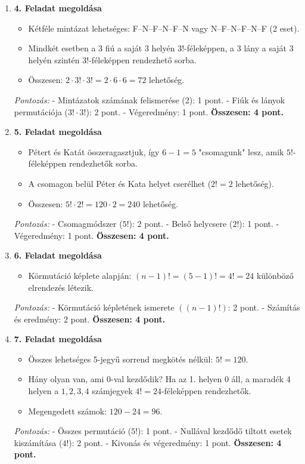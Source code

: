 \documentclass[12pt,a4paper]{article}
\begin{document}
\begin{enumerate}
    \item \textbf{4. Feladat megoldása}
    \begin{itemize}
        \item Kétféle mintázat lehetséges: F--N--F--N--F--N vagy N--F--N--F--N--F (2 eset).
        \item Mindkét esetben a 3 fiú a saját 3 helyén $3!$-féleképpen, a 3 lány a saját 3 helyén szintén $3!$-féleképpen rendezhető sorba.
        \item Összesen: $2 \cdot 3! \cdot 3! = 2 \cdot 6 \cdot 6 = 72$ lehetőség.
    \end{itemize}
    \emph{Pontozás:}
    - Mintázatok számának felismerése (2): 1 pont.
    - Fiúk és lányok permutációja ($3! \cdot 3!$): 2 pont.
    - Végeredmény: 1 pont.
    \textbf{Összesen: 4 pont.}

    \vspace{0.3cm}

    \item \textbf{5. Feladat megoldása}
    \begin{itemize}
        \item Pétert és Katát összeragasztjuk, így $6-1 = 5$ "csomagunk" lesz, amik $5!$-féleképpen rendezhetők sorba.
        \item A csomagon belül Péter és Kata helyet cserélhet ($2! = 2$ lehetőség).
        \item Összesen: $5! \cdot 2! = 120 \cdot 2 = 240$ lehetőség.
    \end{itemize}
    \emph{Pontozás:}
    - Csomagmódszer ($5!$): 2 pont.
    - Belső helycsere ($2!$): 1 pont.
    - Végeredmény: 1 pont.
    \textbf{Összesen: 4 pont.}

    \vspace{0.3cm}

    \item \textbf{6. Feladat megoldása}
    \begin{itemize}
        \item Körmutáció képlete alapján: $(n-1)! = (5-1)! = 4! = 24$ különböző elrendezés létezik.
    \end{itemize}
    \emph{Pontozás:}
    - Körmutáció képletének ismerete $((n-1)!)$: 2 pont.
    - Számítás és eredmény: 2 pont.
    \textbf{Összesen: 4 pont.}

    \vspace{0.3cm}

    \item \textbf{7. Feladat megoldása}
    \begin{itemize}
        \item Összes lehetséges 5-jegyű sorrend megkötés nélkül: $5! = 120$.
        \item Hány olyan van, ami 0-val kezdődik? Ha az 1. helyen 0 áll, a maradék 4 helyen a $1, 2, 3, 4$ számjegyek $4! = 24$-féleképpen rendezhetők.
        \item Megengedett számok: $120 - 24 = 96$.
    \end{itemize}
    \emph{Pontozás:}
    - Összes permutáció ($5!$): 1 pont.
    - Nullával kezdődő tiltott esetek kiszámítása ($4!$): 2 pont.
    - Kivonás és végeredmény: 1 pont.
    \textbf{Összesen: 4 pont.}


\end{enumerate}
\end{document}
